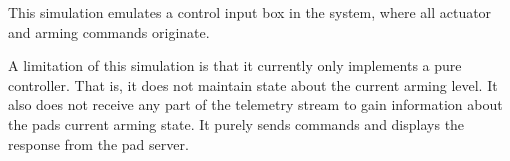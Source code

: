 This simulation emulates a control input box in the system, where all actuator and arming commands originate.

A limitation of this simulation is that it currently only implements a pure controller. That is, it does not maintain state about the current arming level. It also does not receive any part of the telemetry stream to gain information about the pad\textquotesingle{}s current arming state. It purely sends commands and displays the response from the pad server. 